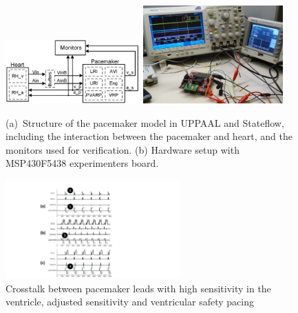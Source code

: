 \begin{figure}[!t]
\centering
		\subfigure 
		{			
		\includegraphics[width=0.46\textwidth]{figs/HM_PM_newMon.png}
		\label{fig:hm_pm}
		}
		\subfigure 
		{	
			\includegraphics[width=0.48\textwidth]{figs/HW_setup1.png}
			\label{fig:PM_timer}
		} 
\caption{(a)~Structure of the pacemaker model in UPPAAL and Stateflow, including the interaction between the pacemaker and heart, and the monitors used for verification. (b) Hardware setup with MSP430F5438 experimenters board.}
\label{fig:setup}
\end{figure} 

\begin{figure}[t]
\center
\vspace{-10pt}
		\includegraphics[width=0.6\textwidth]{figs/crosstalk_all.pdf}
\caption{Crosstalk between pacemaker leads with high sensitivity in the ventricle, adjusted sensitivity and ventricular safety pacing}
\label{fig:crosstalk}
\end{figure}
